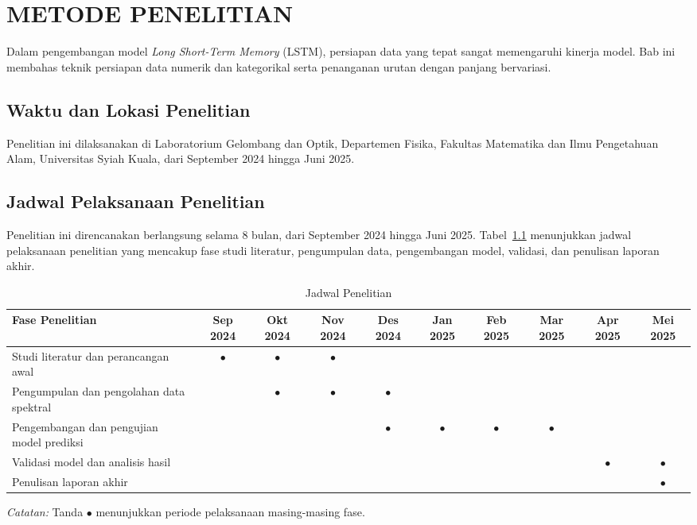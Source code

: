 

\chapter{METODE PENELITIAN}

Dalam pengembangan model \textit{Long Short-Term Memory} (LSTM), persiapan data yang tepat sangat memengaruhi kinerja model. Bab ini membahas teknik persiapan data numerik dan kategorikal serta penanganan urutan dengan panjang bervariasi.

\section{Waktu dan Lokasi Penelitian}
Penelitian ini dilaksanakan di Laboratorium Gelombang dan Optik, Departemen Fisika, Fakultas Matematika dan Ilmu Pengetahuan Alam, Universitas Syiah Kuala, dari September 2024 hingga Juni 2025.

\section{Jadwal Pelaksanaan Penelitian}
Penelitian ini direncanakan berlangsung selama 8 bulan, dari September 2024 hingga Juni 2025. Tabel~\ref{tab:jadwal_penelitian} menunjukkan jadwal pelaksanaan penelitian yang mencakup fase studi literatur, pengumpulan data, pengembangan model, validasi, dan penulisan laporan akhir.

\begin{table}[H]
  \centering
  \caption{Jadwal Penelitian}
  \label{tab:jadwal_penelitian}
  \small %
  \setlength{\tabcolsep}{3pt} %
  \begin{tabular}{p{} *{9}{c}} %
    \toprule
    \textbf{Fase Penelitian} & \textbf{Sep 2024} & \textbf{Okt 2024} & \textbf{Nov 2024} & \textbf{Des 2024} & \textbf{Jan 2025} & \textbf{Feb 2025} & \textbf{Mar 2025} & \textbf{Apr 2025} & \textbf{Mei 2025} \\
    \midrule
    Studi literatur dan perancangan awal & $\bullet$ & $\bullet$ & $\bullet$ & & & & & & \\
    Pengumpulan dan pengolahan data spektral & & $\bullet$ & $\bullet$ & $\bullet$ & & & & & \\
    Pengembangan dan pengujian model prediksi & & & & $\bullet$ & $\bullet$ & $\bullet$ & $\bullet$ & & \\
    Validasi model dan analisis hasil & & & & & & & & $\bullet$ & $\bullet$ \\
    Penulisan laporan akhir & & & & & & & & & $\bullet$ \\
    \bottomrule
  \end{tabular}
  \vspace{0.2cm}
  \footnotesize
  \textit{Catatan:} Tanda $\bullet$ menunjukkan periode pelaksanaan masing-masing fase.
\end{table}

